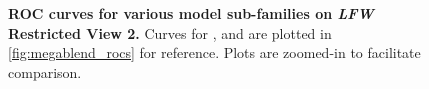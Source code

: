 \begin{figure}[ht]
{  \label{fig:megablend_rocs}
}
\caption[]{{\bf ROC curves for various model sub-families on \emph{LFW}
    Restricted View 2.} Curves for \cite{wolf:accv09}, \cite{kumar:iccv09} and \cite{cao2010face}
  are plotted in \ref{fig:megablend_rocs} for reference.  Plots are zoomed-in to
  facilitate comparison.}
\label{fig:roc_curves}
\end{figure}


